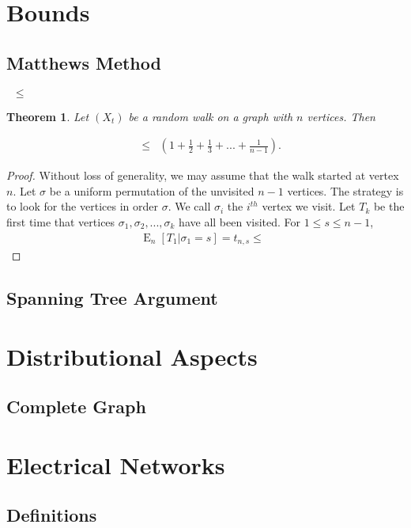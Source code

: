 \documentclass[12pt]{article}
\newtheorem{theorem}{Theorem}
\theoremstyle{definition}
\DeclareMathOperator{\E}{\mathrm{E}}		%
\DeclareMathOperator{\cov}{t_\textrm{cov}}  %
\DeclareMathOperator{\hit}{t_{\textrm{hit}}}%
\begin{document}
\section{Bounds}
\subsection{Matthews Method}


$\hit \leq \cov$

\begin{theorem}
Let $(X_t)$ be a random walk on a graph with $n$ vertices. Then \label{thm:matthews}
\end{theorem}
\begin{align}
\cov &\leq \hit \left(1 + \frac{1}{2} + \frac{1}{3} + ... + \frac{1}{n-1} \right). \nonumber
\end{align}

\begin{proof}
Without loss of generality, we may assume that the walk started at vertex $n$.
Let $\sigma$ be a uniform permutation of the unvisited $n-1$ vertices.
The strategy is to look for the vertices in order $\sigma$.
We call $\sigma_i$ the $i^{th}$ vertex we visit.
Let $T_k$ be the first time that vertices $\sigma_1, \sigma_2, ..., \sigma_k$
have all been visited.
For $1 \leq s \leq n-1$,
\begin{align}
\E_n[T_1 | \sigma_1 = s] = t_{n,s} \leq \hit \nonumber
\end{align}
\end{proof}

\subsection{Spanning Tree Argument}

\section{Distributional Aspects}
\subsection{Complete Graph}

\section{Electrical Networks}
\subsection{Definitions}
\end{document}

